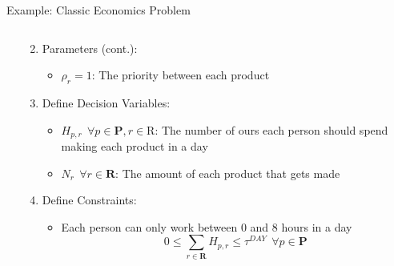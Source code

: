\documentclass[10pt, aspectratio=169]{beamer}
\begin{document}
\begin{frame}[t]{Example: Classic Economics Problem}
\begin{columns}[t]
\begin{column}[t]{0.5\textwidth}
\begin{enumerate}
\begin{itemize}
                \end{itemize}
            \end{enumerate}
        \end{column}
        \begin{column}[t]{0.5\textwidth}
            \begin{enumerate}
                \setcounter{enumi}{1}
                \item Parameters (cont.):
                \begin{itemize}
                    \item $\rho_{r} = 1$: The priority between each product
                \end{itemize}
                \item Define Decision Variables:
                \begin{itemize}
                    \item $H_{p,r} \ \  \forall p \in \textbf{P}, r \in \text{R}$: The number of ours each person should spend making each product in a day
                    \item $N_{r} \ \ \forall r \in \textbf{R}$: The amount of each product that gets made
                \end{itemize}
                \item Define Constraints:
                \begin{itemize}
                    \item Each person can only work between 0 and 8 hours in a day
                    $$0 \leq \sum_{r \in \textbf{R}} H_{p,r} \leq \tau^{DAY} \ \ \forall p \in \textbf{P}$$
                \end{itemize}
            \end{enumerate}
        \end{column}
    \end{columns}
\end{frame}
\end{document}
